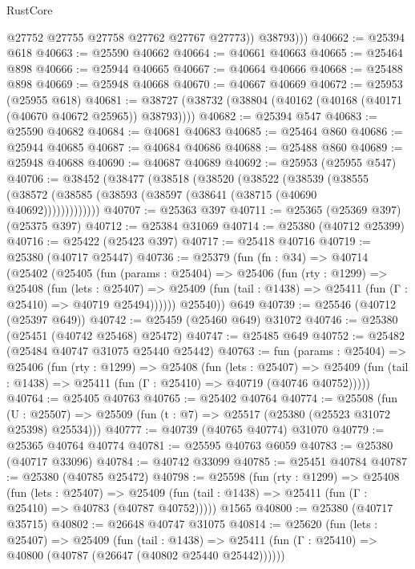 \begin{lexlean}{RustCore}
\begin{coremodule}
              @27752
              @27755
              @27758
              @27762
              @27767
              @27773))
          @38793)))
@40662 := @25394 @618
@40663 := @25590 @40662
@40664 := @40661 @40663
@40665 := @25464 @898
@40666 := @25944 @40665
@40667 := @40664 @40666
@40668 := @25488 @898
@40669 := @25948 @40668
@40670 := @40667 @40669
@40672 := @25953 (@25955 @618)
@40681 := @38727 (@38732 (@38804 (@40162 (@40168 (@40171 (@40670 @40672 @25965)) @38793))))
@40682 := @25394 @547
@40683 := @25590 @40682
@40684 := @40681 @40683
@40685 := @25464 @860
@40686 := @25944 @40685
@40687 := @40684 @40686
@40688 := @25488 @860
@40689 := @25948 @40688
@40690 := @40687 @40689
@40692 := @25953 (@25955 @547)
@40706 := @38452
    (@38477
      (@38518
        (@38520
          (@38522
            (@38539
              (@38555 (@38572 (@38585 (@38593 (@38597 (@38641 (@38715 (@40690 @40692)))))))))))))
@40707 := @25363 @397
@40711 := @25365 (@25369 @397) (@25375 @397)
@40712 := @25384 @31069
@40714 := @25380 (@40712 @25399)
@40716 := @25422 (@25423 @397)
@40717 := @25418 @40716
@40719 := @25380 (@40717 @25447)
@40736 := @25379
    (fun (fn : @34) =>
    @40714
      (@25402
        (@25405
          (fun (params : @25404) =>
          @25406
            (fun (rty : @1299) =>
            @25408
              (fun (lets : @25407) =>
              @25409 (fun (tail : @1438) => @25411 (fun (Γ : @25410) => @40719 @25494))))))
        @25540))
    @649
@40739 := @25546 (@40712 (@25397 @649))
@40742 := @25459 (@25460 @649) @31072
@40746 := @25380 (@25451 (@40742 @25468) @25472)
@40747 := @25485 @649
@40752 := @25482 (@25484 @40747 @31075 @25440 @25442)
@40763 := fun (params : @25404) =>
  @25406
    (fun (rty : @1299) =>
    @25408
      (fun (lets : @25407) =>
      @25409 (fun (tail : @1438) => @25411 (fun (Γ : @25410) => @40719 (@40746 @40752)))))
@40764 := @25405 @40763
@40765 := @25402 @40764
@40774 := @25508
    (fun (U : @25507) => @25509 (fun (t : @7) => @25517 (@25380 (@25523 @31072 @25398) @25534)))
@40777 := @40739 (@40765 @40774) @31070
@40779 := @25365 @40764 @40774
@40781 := @25595 @40763 @6059
@40783 := @25380 (@40717 @33096)
@40784 := @40742 @33099
@40785 := @25451 @40784
@40787 := @25380 (@40785 @25472)
@40798 := @25598
    (fun (rty : @1299) =>
    @25408
      (fun (lets : @25407) =>
      @25409 (fun (tail : @1438) => @25411 (fun (Γ : @25410) => @40783 (@40787 @40752)))))
    @1565
@40800 := @25380 (@40717 @35715)
@40802 := @26648 @40747 @31075
@40814 := @25620
    (fun (lets : @25407) =>
    @25409
      (fun (tail : @1438) =>
      @25411 (fun (Γ : @25410) => @40800 (@40787 (@26647 (@40802 @25440 @25442))))))

\end{coremodule}
\end{lexlean}
